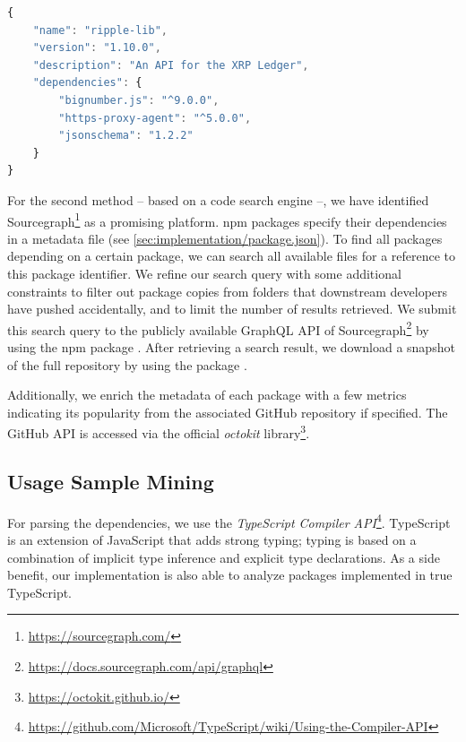 \documentclass[a4paper,twoside]{article}
\begin{document}
\begin{lstfloat}[t]
\begin{lstlisting}[language=typescript,%
	label=sec:implementation/package.json,
	caption={Example \texttt{package.json} file for the \texttt{ripple-lib} package specifying multiple dependencies (truncated). The list of dependencies that are extracted from this example contains \texttt{bignumber.js}, \texttt{https-proxy-agent}, and \texttt{jsonschema}.}]
{
	"name": "ripple-lib",
	"version": "1.10.0",
	"description": "An API for the XRP Ledger",
	"dependencies": {
		"bignumber.js": "^9.0.0",
		"https-proxy-agent": "^5.0.0",
		"jsonschema": "1.2.2"
	}
}
\end{lstlisting}
\end{lstfloat}

For the second method -- based on a code search engine --, we have identified Sourcegraph\footnote{\url{https://sourcegraph.com/}} as a promising platform.
npm packages specify their dependencies in a  metadata file (see \cref{sec:implementation/package.json}).
To find all packages depending on a certain package, we can search all available  files for a reference to this package identifier.
We refine our search query with some additional constraints to filter out package copies from  folders that downstream developers have pushed accidentally, and to limit the number of results retrieved.
We submit this search query to the publicly available GraphQL API of Sourcegraph\footnote{\url{https://docs.sourcegraph.com/api/graphql}} by using the npm package .
After retrieving a search result, we download a snapshot of the full repository by using the package .

Additionally, we enrich the metadata of each package with a few metrics indicating its popularity from the associated GitHub repository if specified.
The GitHub API is accessed via the official \emph{octokit} library\footnote{\url{https://octokit.github.io/}}.

\subsection{Usage Sample Mining}
\label{sec:implementation/usage_mining}

For parsing the dependencies, we use the \emph{TypeScript Compiler API}\footnote{\url{https://github.com/Microsoft/TypeScript/wiki/Using-the-Compiler-API}}.
TypeScript is an extension of JavaScript that adds strong typing; typing is based on a combination of implicit type inference and explicit type declarations.
As a side benefit, our implementation is also able to analyze packages implemented in true TypeScript.
\end{document}
